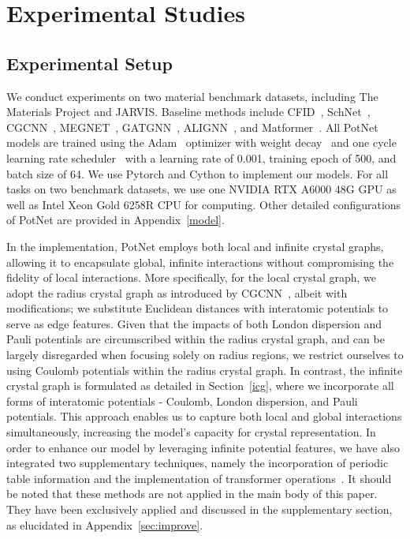 \documentclass[nohyperref]{article}
\theoremstyle{plain}
\theoremstyle{definition}
\theoremstyle{remark}
\begin{document}
\section{Experimental Studies}
\label{experiments} 

\subsection{Experimental Setup} \label{sec:setup}


We conduct experiments on two material benchmark datasets, including The Materials Project and JARVIS. Baseline methods include CFID~\citep{CFID}, SchNet~\citep{schutt2017schnet}, CGCNN~\citep{xie2018crystal}, MEGNET~\citep{MegNet}, GATGNN~\citep{GATGNN}, ALIGNN~\citep{ALIGNN}, and Matformer~\citep{yan2022periodic}. All PotNet models are trained using the Adam~\citep{kingma2014adam} optimizer with weight decay~\citep{loshchilov2017decoupled} and one cycle learning rate scheduler~\citep{smith2018super} with a learning rate of 0.001, training epoch of 500, and batch size of 64. We use Pytorch and Cython to implement our models. For all tasks on two benchmark datasets, we use one NVIDIA RTX A6000 48G GPU as well as Intel Xeon Gold 6258R CPU for computing. Other detailed configurations of PotNet are provided in Appendix~\ref{model}.

In the implementation, PotNet employs both local and infinite crystal graphs, allowing it to encapsulate global, infinite interactions without compromising the fidelity of local interactions. More specifically, for the local crystal graph, we adopt the radius crystal graph as introduced by CGCNN~\citep{xie2018crystal}, albeit with modifications; we substitute Euclidean distances with interatomic potentials to serve as edge features. Given that the impacts of both London dispersion and Pauli potentials are circumscribed within the radius crystal graph, and can be largely disregarded when focusing solely on radius regions, we restrict ourselves to using Coulomb potentials within the radius crystal graph. In contrast, the infinite crystal graph is formulated as detailed in Section~\ref{icg}, where we incorporate all forms of interatomic potentials - Coulomb, London dispersion, and Pauli potentials. This approach enables us to capture both local and global interactions simultaneously, increasing the model's capacity for crystal representation. In order to enhance our model by leveraging infinite potential features, we have also integrated two supplementary techniques, namely the incorporation of periodic table information and the implementation of transformer operations~\citep{graphormer, yan2022periodic}. It should be noted that these methods are not applied in the main body of this paper. They have been exclusively applied and discussed in the supplementary section, as elucidated in Appendix~\ref{sec:improve}.
\end{document}
